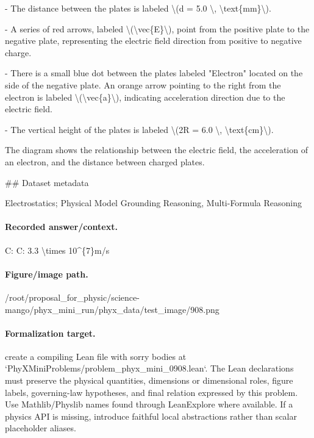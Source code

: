 - The distance between the plates is labeled \textbackslash{}(d = 5.0 \textbackslash{}, \textbackslash{}text\{mm\}\textbackslash{}).

- A series of red arrows, labeled \textbackslash{}(\textbackslash{}vec\{E\}\textbackslash{}), point from the positive plate to the negative plate, representing the electric field direction from positive to negative charge.

- There is a small blue dot between the plates labeled "Electron" located on the side of the negative plate. An orange arrow pointing to the right from the electron is labeled \textbackslash{}(\textbackslash{}vec\{a\}\textbackslash{}), indicating acceleration direction due to the electric field.

- The vertical height of the plates is labeled \textbackslash{}(2R = 6.0 \textbackslash{}, \textbackslash{}text\{cm\}\textbackslash{}).

The diagram shows the relationship between the electric field, the acceleration of an electron, and the distance between charged plates.

\#\# Dataset metadata

Electrostatics; Physical Model Grounding Reasoning, Multi-Formula Reasoning

\paragraph{Recorded answer/context.}
C: C: 3.3 \textbackslash{}times 10\textasciicircum{}\{7\}m/s

\paragraph{Figure/image path.}
/root/proposal\_for\_physic/science-mango/phyx\_mini\_run/phyx\_data/test\_image/908.png

\paragraph{Formalization target.}
create a compiling Lean file with sorry bodies at `PhyXMiniProblems/problem\_phyx\_mini\_0908.lean`. The Lean declarations must preserve the physical quantities, dimensions or dimensional roles, figure labels, governing-law hypotheses, and final relation expressed by this problem.
Use Mathlib/Physlib names found through LeanExplore where available. If a physics API is missing, introduce faithful local abstractions rather than scalar placeholder aliases.

